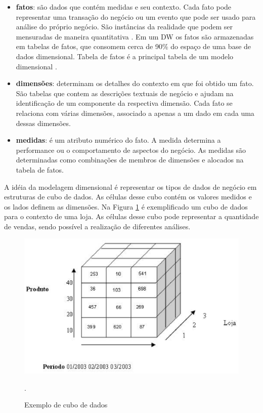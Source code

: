 \begin{itemize}
	\item \textbf{fatos}: são dados que contém medidas e seu contexto. Cada fato pode representar uma transação do negócio ou um evento que pode ser usado para análise do próprio negócio. São instâncias da realidade  que podem ser mensuradas de maneira quantitativa \cite{kimball2002}. Em um DW os fatos são armazenadas em tabelas de fatos, que consomem cerca de 90\% do espaço de uma base de dados dimensional. Tabela de fatos é a principal tabela de um modelo dimensional \cite{kimball2002} \cite{ballard1998}.
	\item \textbf{dimensões}: determinam os detalhes do contexto em que foi obtido um fato. São tabelas que contem as descrições textuais de negócio e ajudam na identificação de um componente da respectiva dimensão. Cada fato se relaciona com várias dimensões, associado a apenas a um dado em cada uma dessas dimensões.
	\item \textbf{medidas}: é um atributo numérico do fato. A medida determina a performance ou o comportamento de aspectos do negócio. As medidas são determinadas como combinações de membros de dimensões e alocados na tabela de fatos.
\end{itemize}

%

A idéia da modelagem dimensional é representar os tipos de dados de negócio em estruturas de cubo de dados. As células desse cubo contém os valores medidos e os lados definem as dimensões. Na Figura \ref{dw-cube} é exemplificado um cubo de dados para o contexto de uma loja. As células desse cubo pode representar a quantidade de vendas, sendo possível a realização de diferentes análises.

%


 \begin{figure}[!htb]
 	\centering
 		\includegraphics[scale=0.8]{figuras/dw-cubo}
 		\caption{Exemplo de cubo de dados}.
 		\label{dw-cube}
 \end{figure}


